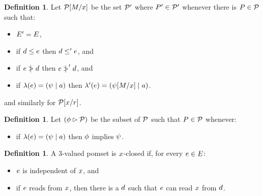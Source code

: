 \documentclass[conference]{IEEEtran}
\theoremstyle{plain}
\theoremstyle{definition}
\newtheorem{definition}[theorem]{Definition}
\begin{document}
\begin{definition}
Let $\mathcal{P}[M/x]$ be the set $\mathcal{P}'$ where $P'\in\mathcal{P}'$ whenever
there is $P\in\mathcal{P}$ such that:
\begin{itemize}
\item $E' = E$,
\item if $d \le e$ then $d \le' e$, and
\item if $e \mathrel{\,\mid\!\!\!>} d$ then $e \mathrel{\,\mid\!\!\!>}' d$, and
\item if $\lambda(e) = (\psi \mid a)$ then $\lambda'(e) = (\psi[M/x] \mid a)$.
\end{itemize}
and similarly for $\mathcal{P}[x/r]$.
\end{definition}

\begin{definition}
Let $(\phi \mathbin\rhd \mathcal{P})$ be the subset of $\mathcal{P}$ such that $P\in\mathcal{P}$ whenever:
\begin{itemize}
\item if $\lambda(e) = (\psi \mid a)$ then $\phi$ implies $\psi$.
\end{itemize}
\end{definition}



\begin{definition}
\label{def:x-closed}
  A 3-valued pomset is $x$-closed if,
  for every $e\in E$:
  \begin{itemize}
  \item $e$ is independent of $x$, and
  \item if $e$ reads from $x$, then there is a $d$ such that $e$ can read $x$ from $d$.
  \end{itemize}
\end{definition}
\end{document}
